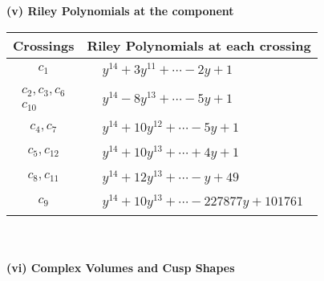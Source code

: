 \documentclass[1p]{elsarticle_modified}
\theoremstyle{definition}
\begin{document}
\newpage\renewcommand{\arraystretch}{1}
\flushleft \textbf{(v) Riley Polynomials at the component}\newline \\
\begin{tabular}{m{50pt}|m{274pt}}
Crossings & \hspace{64pt}Riley Polynomials at each crossing \\
\hline $$\begin{aligned}c_{1}\end{aligned}$$&$\begin{aligned}
&y^{14}+3 y^{11}+\cdots-2 y+1
\end{aligned}$\\
\hline $$\begin{aligned}c_{2},c_{3},c_{6}\\c_{10}\end{aligned}$$&$\begin{aligned}
&y^{14}-8 y^{13}+\cdots-5 y+1
\end{aligned}$\\
\hline $$\begin{aligned}c_{4},c_{7}\end{aligned}$$&$\begin{aligned}
&y^{14}+10 y^{12}+\cdots-5 y+1
\end{aligned}$\\
\hline $$\begin{aligned}c_{5},c_{12}\end{aligned}$$&$\begin{aligned}
&y^{14}+10 y^{13}+\cdots+4 y+1
\end{aligned}$\\
\hline $$\begin{aligned}c_{8},c_{11}\end{aligned}$$&$\begin{aligned}
&y^{14}+12 y^{13}+\cdots- y+49
\end{aligned}$\\
\hline $$\begin{aligned}c_{9}\end{aligned}$$&$\begin{aligned}
&y^{14}+10 y^{13}+\cdots-227877 y+101761
\end{aligned}$\\
\hline
\end{tabular}\\~\\
\newpage\flushleft \textbf{(vi) Complex Volumes and Cusp Shapes}
\end{document}
